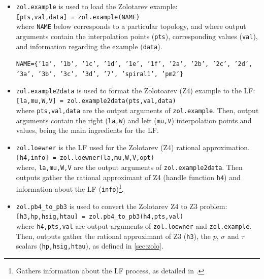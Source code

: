 \begin{itemize}
\item \texttt{zol.example} is used to load the Zolotarev example: \\
\texttt{[pts,val,data] = zol.example(NAME)}\\
where \texttt{NAME} below  corresponds to a particular topology, and where output arguments contain the interpolation points (\texttt{pts}), corresponding values (\texttt{val}), and information regarding the example (\texttt{data}).
\begin{center}
\texttt{NAME=\{'1a', '1b', '1c', '1d', '1e', '1f', '2a', '2b', '2c', '2d', '3a', '3b', '3c', '3d', '7', 'spiral1', 'pm2'\}}    
\end{center}

\item \texttt{zol.example2data} is used to format the Zolotoarev (Z4) example to the LF:\\
\texttt{[la,mu,W,V] = zol.example2data(pts,val,data)}\\
where \texttt{pts,val,data} are the output arguments of \texttt{zol.example}. Then, output arguments contain the right  (\texttt{la,W}) and left (\texttt{mu,V}) interpolation points and values, being the main ingredients for the LF.

\item \texttt{zol.loewner} is the LF used for the Zolotarev (Z4) rational approximation.\\
\texttt{[h4,info] = zol.loewner(la,mu,W,V,opt)} \\
where, \texttt{la,mu,W,V} are the output arguments of \texttt{zol.example2data}. Then outputs gather the rational approximant of Z4 (handle function \texttt{h4}) and information about the LF (\texttt{info})\footnote{Gathers information about the LF process, as detailed in \cite{ali17}.}.
\item \texttt{zol.pb4\_to\_pb3} is used to convert the Zolotarev Z4 to Z3 problem:\\
\texttt{[h3,hp,hsig,htau] = zol.pb4\_to\_pb3(h4,pts,val)}\\
where \texttt{h4,pts,val} are output arguments of \texttt{zol.loewner} and \texttt{zol.example}. Then, outputs gather the rational approximant of Z3 (\texttt{h3}), the $p$, $\sigma$ and $\tau$ scalars (\texttt{hp,hsig,htau}), as defined in \cref{sec:zolo}.
\end{itemize}

